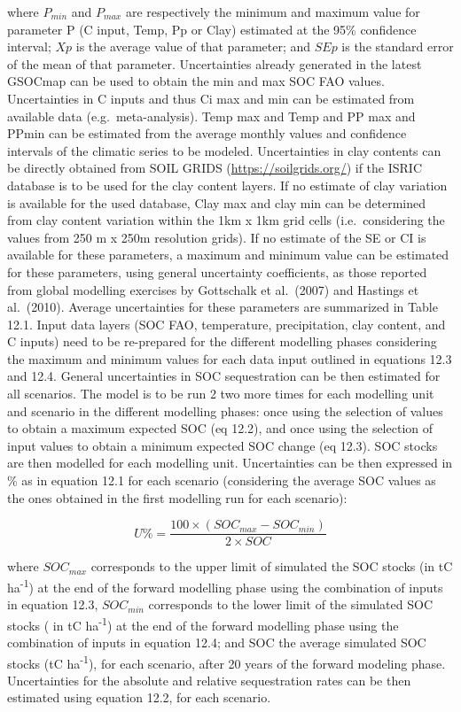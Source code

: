 \documentclass[
  10pt,
  b5paper,
]{book}
\begin{document}
where \(P_{min}\) and \(P_{max}\) are respectively the minimum and maximum value for parameter P (C input, Temp, Pp or Clay) estimated at the 95\% confidence interval; \(Xp\) is the average value of that parameter; and \(SEp\) is the standard error of the mean of that parameter.
Uncertainties already generated in the latest GSOCmap can be used to obtain the min and max SOC FAO values. Uncertainties in C inputs and thus Ci max and min can be estimated from available data (e.g.~meta-analysis). Temp max and Temp and PP max and PPmin can be estimated from the average monthly values and confidence intervals of the climatic series to be modeled. Uncertainties in clay contents can be directly obtained from SOIL GRIDS (\url{https://soilgrids.org/}) if the ISRIC database is to be used for the clay content layers. If no estimate of clay variation is available for the used database, Clay max and clay min can be determined from clay content variation within the 1km x 1km grid cells (i.e.~considering the values from 250 m x 250m resolution grids).
If no estimate of the SE or CI is available for these parameters, a maximum and minimum value can be estimated for these parameters, using general uncertainty coefficients, as those reported from global modelling exercises by Gottschalk et al.~(2007) and Hastings et al.~(2010). Average uncertainties for these parameters are summarized in Table 12.1.
Input data layers (SOC FAO, temperature, precipitation, clay content, and C inputs) need to be re-prepared for the different modelling phases considering the maximum and minimum values for each data input outlined in equations 12.3 and 12.4.
General uncertainties in SOC sequestration can be then estimated for all scenarios. The model is to be run 2 two more times for each modelling unit and scenario in the different modelling phases: once using the selection of values to obtain a maximum expected SOC (eq 12.2), and once using the selection of input values to obtain a minimum expected SOC change (eq 12.3). SOC stocks are then modelled for each modelling unit. Uncertainties can be then expressed in \% as in equation 12.1 for each scenario (considering the average SOC values as the ones obtained in the first modelling run for each scenario):

\begin{equation}
\tag{12.7}
U \%=\frac{100 \times (SOC_{max} - SOC_{min})}{2 \times SOC}	
\end{equation}

where \(SOC_{max}\) corresponds to the upper limit of simulated the SOC stocks (in tC ha\textsuperscript{-1}) at the end of the forward modelling phase using the combination of inputs in equation 12.3, \(SOC_{min}\) corresponds to the lower limit of the simulated SOC stocks ( in tC ha\textsuperscript{-1}) at the end of the forward modelling phase using the combination of inputs in equation 12.4; and SOC the average simulated SOC stocks (tC ha\textsuperscript{-1}), for each scenario, after 20 years of the forward modeling phase. Uncertainties for the absolute and relative sequestration rates can be then estimated using equation 12.2, for each scenario.
\end{document}
